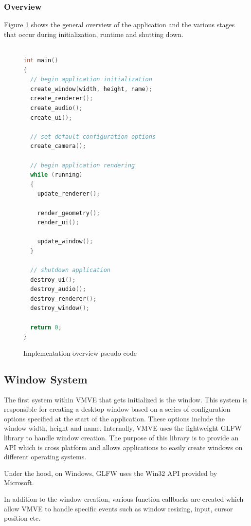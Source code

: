 \documentclass[11pt]{article}
\begin{document}
\subsubsection{Overview}
Figure \ref{fig:overview_pseudo_code} shows the general overview of the application and the various 
stages that occur during initialization, runtime and shutting down.


\begin{figure}[ht]
\centering
\begin{lstlisting}[language=C++]

int main()
{
  // begin application initialization
  create_window(width, height, name);
  create_renderer();
  create_audio();
  create_ui();

  // set default configuration options
  create_camera();
  
  // begin application rendering
  while (running)
  {
    update_renderer();

    render_geometry();
    render_ui();

    update_window();
  }

  // shutdown application
  destroy_ui();
  destroy_audio();
  destroy_renderer();
  destroy_window();

  return 0;
}
\end{lstlisting}
\caption{Implementation overview pseudo code}
\label{fig:overview_pseudo_code}
\end{figure}

  

\subsection{Window System}
The first system within VMVE that gets initialized is the window. This system is
responsible for creating a desktop window based on a series of configuration
options specified at the start of the application. These options include the
window width, height and name. Internally, VMVE uses the lightweight GLFW
library to handle window creation. The purpose of this library is to provide an
API which is cross platform and allows applications to easily create windows on
different operating systems. 

Under the hood, on Windows, GLFW uses the Win32 API provided by Microsoft.

In addition to the window creation, various function callbacks are created
which allow VMVE to handle specific events such as window resizing, input,
cursor position etc.
\end{document}
